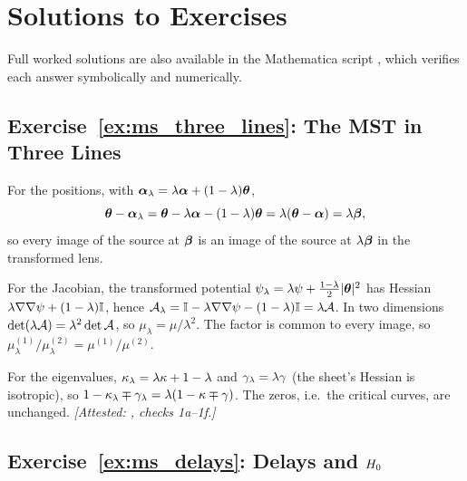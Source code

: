 
\section{Solutions to Exercises}
\label{sec:ms_solutions}

\noindent
Full worked solutions are also available in the Mathematica script
,
which verifies each answer symbolically and numerically.

\subsection*{Exercise~\ref{ex:ms_three_lines}: The MST in Three Lines}

For the positions, with $\boldsymbol{\alpha}_\lambda=\lambda\boldsymbol{\alpha}+(1-\lambda)\boldsymbol{\theta}$,
\[
\boldsymbol{\theta}-\boldsymbol{\alpha}_\lambda=\boldsymbol{\theta}-\lambda\boldsymbol{\alpha}-(1-\lambda)\boldsymbol{\theta}
=\lambda(\boldsymbol{\theta}-\boldsymbol{\alpha})=\lambda\boldsymbol{\beta} ,
\]
so every image of the source at $\boldsymbol{\beta}$ is an image of the source at
$\lambda\boldsymbol{\beta}$ in the transformed lens.

For the Jacobian, the transformed potential
$\psi_\lambda=\lambda\psi+\tfrac{1-\lambda}{2}|\boldsymbol{\theta}|^2$ has Hessian
$\lambda\nabla\nabla\psi+(1-\lambda)\mathbb{I}$, hence
$\mathcal{A}_\lambda=\mathbb{I}-\lambda\nabla\nabla\psi-(1-\lambda)\mathbb{I}=\lambda\mathcal{A}$.
In two dimensions $\det(\lambda\mathcal{A})=\lambda^2\det\mathcal{A}$, so
$\mu_\lambda=\mu/\lambda^2$.  The factor is common to every image, so
$\mu^{(1)}_\lambda/\mu^{(2)}_\lambda=\mu^{(1)}/\mu^{(2)}$.

For the eigenvalues, $\kappa_\lambda=\lambda\kappa+1-\lambda$ and
$\gamma_\lambda=\lambda\gamma$ (the sheet's Hessian is isotropic), so
$1-\kappa_\lambda\mp\gamma_\lambda=\lambda(1-\kappa\mp\gamma)$.  The zeros,
i.e.\ the critical curves, are unchanged.
\emph{[Attested: , checks 1a--1f.]}

\subsection*{Exercise~\ref{ex:ms_delays}: Delays and $H_0$}

